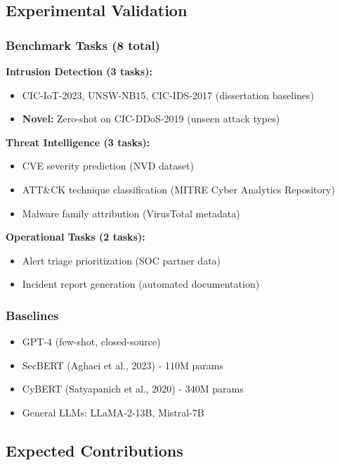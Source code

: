 \documentclass[11pt,letterpaper]{article}
\begin{document}
\subsection{Experimental Validation}

\subsubsection{Benchmark Tasks (8 total)}

\textbf{Intrusion Detection (3 tasks):}
\begin{itemize}
\item CIC-IoT-2023, UNSW-NB15, CIC-IDS-2017 (dissertation baselines)
\item \textbf{Novel:} Zero-shot on CIC-DDoS-2019 (unseen attack types)
\end{itemize}

\textbf{Threat Intelligence (3 tasks):}
\begin{itemize}
\item CVE severity prediction (NVD dataset)
\item ATT\&CK technique classification (MITRE Cyber Analytics Repository)
\item Malware family attribution (VirusTotal metadata)
\end{itemize}

\textbf{Operational Tasks (2 tasks):}
\begin{itemize}
\item Alert triage prioritization (SOC partner data)
\item Incident report generation (automated documentation)
\end{itemize}

\subsubsection{Baselines}
\begin{itemize}
\item GPT-4 (few-shot, closed-source)
\item SecBERT (Aghaei et al., 2023) - 110M params
\item CyBERT (Satyapanich et al., 2020) - 340M params
\item General LLMs: LLaMA-2-13B, Mistral-7B
\end{itemize}

\subsection{Expected Contributions}
\end{document}

